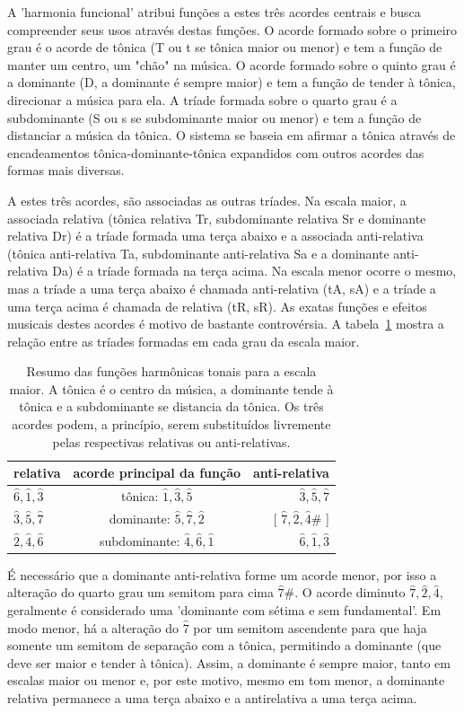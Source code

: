A 'harmonia funcional' atribui funções a estes três acordes centrais e busca compreender seus usos através destas funções. O acorde formado sobre o primeiro grau é o acorde de tônica (T ou t se tônica maior ou menor) e tem a função de manter um centro, um "chão" na música. O acorde formado sobre o quinto grau é a dominante (D, a dominante é sempre maior) e tem a função de tender à tônica, direcionar a música para ela. A tríade formada sobre o quarto grau é a subdominante (S ou s se subdominante maior ou menor) e tem a função de distanciar a música da tônica. O sistema se baseia em afirmar a tônica através de encadeamentos tônica-dominante-tônica expandidos com outros acordes das formas mais diversas.

A estes três acordes, são associadas as outras tríades. Na escala maior, a associada relativa (tônica relativa Tr, subdominante relativa Sr e dominante relativa Dr) é a tríade formada uma terça abaixo e a associada anti-relativa (tônica anti-relativa Ta, subdominante anti-relativa Sa e a dominante anti-relativa Da) é a tríade formada na terça acima. Na escala menor ocorre o mesmo, mas a tríade a uma terça abaixo é chamada anti-relativa (tA, sA) e a tríade a uma terça acima é chamada de relativa (tR, sR). As exatas funções e efeitos musicais destes acordes é motivo de bastante controvérsia. A tabela~\ref{tab:harmonia} mostra a relação entre as tríades formadas em cada grau da escala maior.

\begin{table}[htpq!]
\centering
\caption{Resumo das funções harmônicas tonais para a escala maior. A tônica é o centro da música, a dominante tende à tônica e a subdominante se distancia da tônica. Os três acordes podem, a princípio, serem substituídos livremente pelas respectivas relativas ou anti-relativas.}
\begin{tabular}{l | c | r}
relativa & acorde principal da função & anti-relativa \\\hline\hline
$\hat{6},\hat{1},\hat{3}$ & tônica:       $\hat{1},\hat{3},\hat{5}$ & $\hat{3}, \hat{5},      \hat{7}$ \\
$\hat{3},\hat{5},\hat{7}$ & dominante:    $\hat{5},\hat{7},\hat{2}$ & [ $\hat{7},\hat{2},\hat{4}\#$ ] \\
$\hat{2},\hat{4},\hat{6}$ & subdominante: $\hat{4},\hat{6},\hat{1}$ & $\hat{6},\hat{1},       \hat{3}$
\end{tabular}
\label{tab:harmonia}
\end{table}

É necessário que a dominante anti-relativa forme um acorde menor, por isso a alteração do quarto grau um semitom para cima $\hat{7}\#$. O acorde diminuto $\hat{7},\hat{2},\hat{4}$, geralmente é considerado uma 'dominante com sétima e sem fundamental'.\cite{Koellheuteur}
Em modo
menor, há a alteração do $\hat{7}$ por um semitom ascendente para que haja somente um semitom de separação com a tônica,
permitindo a dominante (que deve ser maior e tender à tônica). Assim, a dominante é sempre maior, tanto em escalas maior ou menor e, por este motivo, mesmo em tom menor, a dominante relativa permanece a uma terça abaixo e a antirelativa a uma terça acima.

